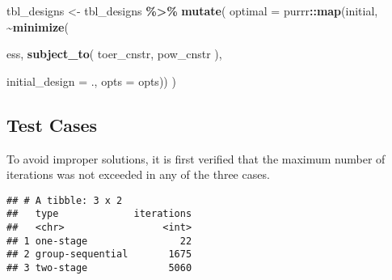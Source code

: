 \documentclass[
]{book}
\newenvironment{Shaded}{\begin{snugshade}}{\end{snugshade}}
\newcommand{\DataTypeTok}[1]{\textcolor[rgb]{0.13,0.29,0.53}{#1}}
\newcommand{\KeywordTok}[1]{\textcolor[rgb]{0.13,0.29,0.53}{\textbf{#1}}}
\newcommand{\NormalTok}[1]{#1}
\newcommand{\OperatorTok}[1]{\textcolor[rgb]{0.81,0.36,0.00}{\textbf{#1}}}
\newcommand{\StringTok}[1]{\textcolor[rgb]{0.31,0.60,0.02}{#1}}
\begin{document}
\begin{Shaded}
\begin{Highlighting}[]
\NormalTok{tbl\_designs \textless{}{-}}\StringTok{ }\NormalTok{tbl\_designs }\OperatorTok{\%\textgreater{}\%}\StringTok{ }
\StringTok{    }\KeywordTok{mutate}\NormalTok{(}
       \DataTypeTok{optimal =}\NormalTok{ purrr}\OperatorTok{::}\KeywordTok{map}\NormalTok{(initial, }\OperatorTok{\textasciitilde{}}\KeywordTok{minimize}\NormalTok{(}
         
\NormalTok{          ess,}
          \KeywordTok{subject\_to}\NormalTok{(}
\NormalTok{              toer\_cnstr,}
\NormalTok{              pow\_cnstr}
\NormalTok{          ),}
          
          \DataTypeTok{initial\_design =}\NormalTok{ ., }
          \DataTypeTok{opts           =}\NormalTok{ opts)) )}
\end{Highlighting}
\end{Shaded}

\hypertarget{test-cases-14}{%
\subsection{Test Cases}\label{test-cases-14}}

To avoid improper solutions, it is first verified that the maximum
number of iterations was not exceeded in any of the three cases.

\begin{Shaded}
\end{Shaded}

\begin{verbatim}
## # A tibble: 3 x 2
##   type             iterations
##   <chr>                 <int>
## 1 one-stage                22
## 2 group-sequential       1675
## 3 two-stage              5060
\end{verbatim}
\end{document}
